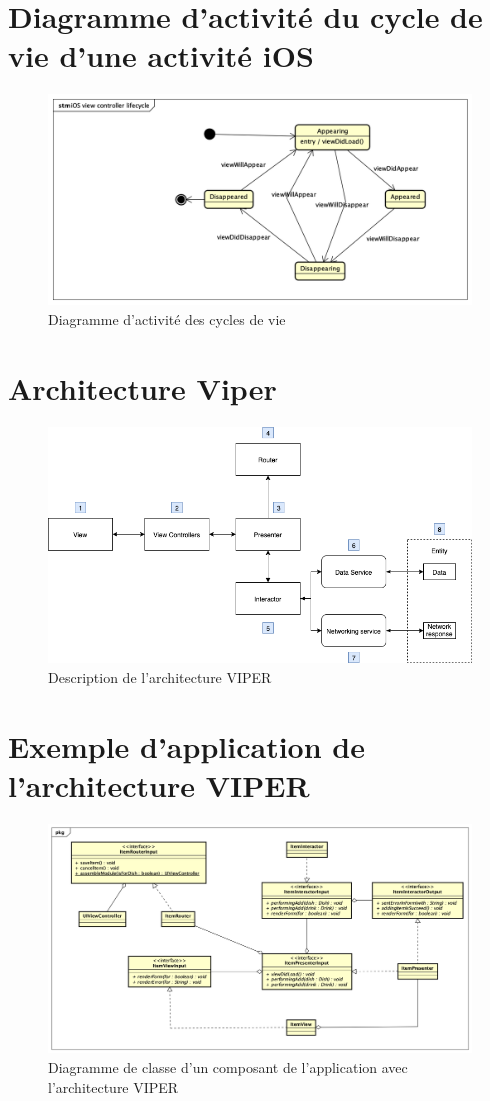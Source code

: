 \section{Diagramme d'activité du cycle de vie d'une activité iOS}
\begin{figure}[H]
	\centering
	\includegraphics[scale=0.55]{assets/images/iOS_view_lifecycle.png}
	\caption{Diagramme d'activité des cycles de vie}
	\label{fig.ios_act}
\end{figure}
\section{Architecture Viper}
\begin{figure}[H]
	\centering
	\includegraphics[scale=0.55]{assets/images/viper_one.png}
	\caption{Description de l'architecture VIPER}
	\label{fig.ios_viper}
\end{figure}
\section{Exemple d'application de l'architecture VIPER}
\begin{figure}[H]
	\centering
	\includegraphics[scale=0.4]{assets/images/viper_example.png}
	\caption{Diagramme de classe d'un composant de l'application avec l'architecture VIPER}
	\label{fig.ios_viper_example}
\end{figure}